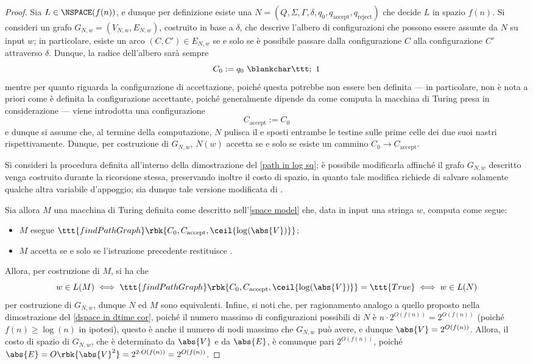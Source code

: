 \documentclass[a4paper, 12pt]{report}
\begin{document}
    \begin{proof}
        Sia $L \in \NSPACE(f(n))$, e dunque per definizione esiste una \NTM $N = (Q, \Sigma, \Gamma, \delta, q_0, q_\mathrm{accept}, q_\mathrm{reject})$ che decide $L$ in spazio $f(n)$. Si consideri un grafo $G_{N,w} = (V_{N, w}, E_{N, w})$, costruito in base a $\delta$, che descrive l'albero di configurazioni che possono essere assunte da $N$ su input $w$; in particolare, esiste un arco $(C, C') \in E_{N, w}$ se e solo se è possibile passare dalla configurazione $C$ alla configurazione $C'$ attraverso $\delta$. Dunque, la radice dell'albero sarà sempre $$C_0 := q_0 \ \blankchar \ttt; \ 1$$ mentre per quanto riguarda la configurazione di accettazione, poiché questa potrebbe non essere ben definita --- in particolare, non è nota a priori come è definita la configurazione accettante, poiché generalmente dipende da come computa la macchina di Turing presa in considerazione --- viene introdotta una configurazione $$C_\mathrm{accept} := C_0$$ e dunque si assume che, al termine della computazione, $N$ pulisca il  e sposti entrambe le testine sulle prime celle dei due suoi nastri rispettivamente. Dunque, per costruzione di $G_{N,w}$, $N(w)$ accetta se e solo se esiste un cammino $C_0 \to C_\mathrm{accept}$.

        Si consideri la procedura  definita all'interno della dimostrazione del \cref{path in log sq}; è possibile modificarla affinché il grafo $G_{N, w}$ descritto venga costruito durante la ricorsione stessa, preservando inoltre il costo di spazio, in quanto tale modifica richiede di salvare solamente qualche altra variabile d'appoggio; sia dunque  tale versione modificata di .

        Sia allora $M$ una macchina di Turing definita come descritto nell'\cref{space model} che, data in input una stringa $w$, computa come segue:

        \begin{itemize}
            \item $M$ esegue $\ttt{findPathGraph} \rbk{C_0, C_\mathrm{accept}, \ceil{\log(\abs{V})}}$;
            \item $M$ accetta se e solo se l'istruzione precedente restituisce .
        \end{itemize}

        Allora, per costruzione di $M$, si ha che $$w \in L(M) \iff \ttt{findPathGraph} \rbk{C_0, C_\mathrm{accept}, \ceil{\log(\abs{V})}} = \ttt{True} \iff w \in L(N)$$ per costruzione di $G_{N, w}$, dunque $N$ ed $M$ sono equivalenti. Infine, si noti che, per ragionamento analogo a quello proposto nella dimostrazione del \cref{dspace in dtime cor}, poiché il numero massimo di configurazioni possibili di $N$ è $n \cdot 2^{O(f(n))} = 2^{O(f(n))}$ (poiché $f(n) \geq \log(n)$ in ipotesi), questo è anche il numero di nodi massimo che $G_{N, w}$ può avere, e dunque $\abs{V} = 2^{O(f(n))}$. Allora, il costo di spazio di $G_{N, w}$, che è determinato da $\abs{V}$ e da $\abs{E}$, è comunque pari $2^{O(f(n))}$, poiché $\abs{E} = O \rbk{\abs{V}^2} = 2^{2 \cdot O(f(n))} = 2^{O(f(n))}$.


\end{proof}
\end{document}
